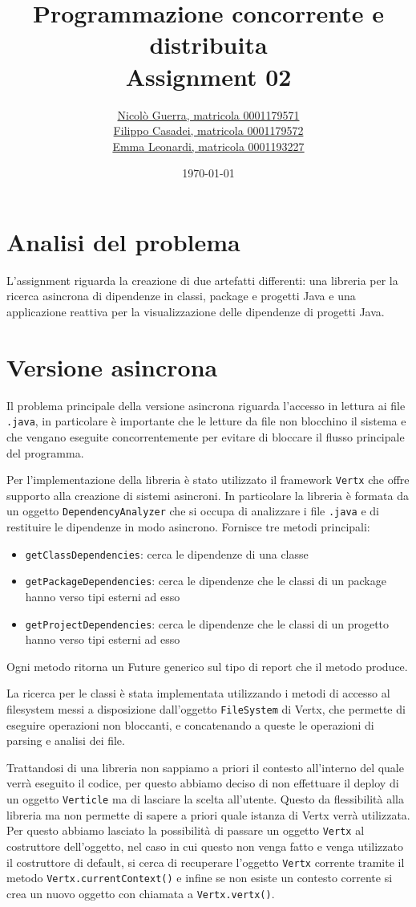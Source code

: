 \documentclass[11pt,notitlepage]{article}
\title{Programmazione concorrente e distribuita \\ Assignment 02}
\author{
    \href{mailto:nicolo.guerra@studio.unibo.it}{Nicolò Guerra, matricola 0001179571} \\
    \href{mailto:filippo.casadei9@studio.unibo.it}{Filippo Casadei, matricola 0001179572} \\
    \href{mailto:emma.leonardi2@studio.unibo.it}{Emma Leonardi, matricola 0001193227}
    }
\date{\today}
\begin{document}
\maketitle
\renewcommand{\thesection}{\arabic{section}}
\section{Analisi del problema}

L'assignment riguarda la creazione di due artefatti differenti: una libreria per la ricerca asincrona di dipendenze in classi, package e progetti Java e una applicazione
reattiva per la visualizzazione delle dipendenze di progetti Java.

\section{Versione asincrona}
Il problema principale della versione asincrona riguarda l'accesso in lettura ai file \texttt{.java}, in particolare è importante che le letture da file non blocchino 
il sistema e che vengano eseguite concorrentemente per evitare di bloccare il flusso principale del programma.

Per l'implementazione della libreria è stato utilizzato il framework \texttt{Vertx} che offre supporto alla creazione di sistemi asincroni. In particolare la libreria è formata 
da un oggetto \texttt{DependencyAnalyzer} che si occupa di analizzare i file \texttt{.java} e di restituire le dipendenze in modo asincrono. Fornisce tre metodi principali:
\begin{itemize}
    \item \texttt{getClassDependencies}: cerca le dipendenze di una classe
    \item \texttt{getPackageDependencies}: cerca le dipendenze che le classi di un package hanno verso tipi esterni ad esso
    \item \texttt{getProjectDependencies}: cerca le dipendenze che le classi di un progetto hanno verso tipi esterni ad esso
\end{itemize}
Ogni metodo ritorna un Future generico sul tipo di report che il metodo produce.

La ricerca per le classi è stata implementata utilizzando i metodi di accesso al filesystem messi a disposizione dall'oggetto \texttt{FileSystem} di Vertx, che 
permette di eseguire operazioni non bloccanti, e concatenando a queste le operazioni di parsing e analisi dei file.

Trattandosi di una libreria non sappiamo a priori il contesto all'interno del quale verrà eseguito il codice, per questo abbiamo deciso di non effettuare il deploy di
un oggetto \texttt{Verticle} ma di lasciare la scelta all'utente. Questo da flessibilità alla libreria ma non permette di sapere a priori quale istanza di Vertx verrà utilizzata.
Per questo abbiamo lasciato la possibilità di passare un oggetto \texttt{Vertx} al costruttore dell'oggetto, nel caso in cui questo non venga fatto e venga utilizzato il costruttore
di default, si cerca di recuperare l'oggetto \texttt{Vertx} corrente tramite il metodo \texttt{Vertx.currentContext()} e infine se non esiste un contesto corrente si crea un nuovo
oggetto con chiamata a \texttt{Vertx.vertx()}.
\end{document}
